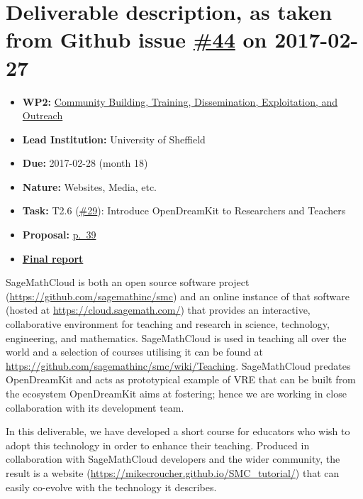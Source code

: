 \section*{\texorpdfstring{Deliverable description, as taken from Github
issue
\href{https://github.com/OpenDreamKit/OpenDreamKit/issues/44}{\#44} on
2017-02-27}{Deliverable description, as taken from Github issue \#44 on 2017-02-27}}\label{deliverable-description-as-taken-from-github-issue-44-on-2017-02-27}

\begin{itemize}
\tightlist
\item
  \textbf{WP2:}
  \href{https://github.com/OpenDreamKit/OpenDreamKit/tree/master/WP2}{Community
  Building, Training, Dissemination, Exploitation, and Outreach}
\item
  \textbf{Lead Institution:} University of Sheffield
\item
  \textbf{Due:} 2017-02-28 (month 18)
\item
  \textbf{Nature:} Websites, Media, etc.
\item
  \textbf{Task:} T2.6
  (\href{https://github.com/OpenDreamKit/OpenDreamKit/issues/29}{\#29}):
  Introduce OpenDreamKit to Researchers and Teachers
\item
  \textbf{Proposal:}
  \href{https://github.com/OpenDreamKit/OpenDreamKit/raw/master/Proposal/proposal-www.pdf}{p.~39}
\item
  \textbf{\href{https://github.com/OpenDreamKit/OpenDreamKit/raw/master/WP2/D2.4/report-final.pdf}{Final
  report}}
\end{itemize}

SageMathCloud is both an open source software project
(\url{https://github.com/sagemathinc/smc}) and an online instance of
that software (hosted at \url{https://cloud.sagemath.com/}) that
provides an interactive, collaborative environment for teaching and
research in science, technology, engineering, and mathematics.
SageMathCloud is used in teaching all over the world and a selection of
courses utilising it can be found at
\url{https://github.com/sagemathinc/smc/wiki/Teaching}. SageMathCloud
predates OpenDreamKit and acts as prototypical example of VRE that can
be built from the ecosystem OpenDreamKit aims at fostering; hence we are
working in close collaboration with its development team.

In this deliverable, we have developed a short course for educators who
wish to adopt this technology in order to enhance their teaching.
Produced in collaboration with SageMathCloud developers and the wider
community, the result is a website
(\url{https://mikecroucher.github.io/SMC_tutorial/}) that can easily
co-evolve with the technology it describes.
